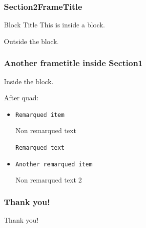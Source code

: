 \documentclass[10pt]{beamer}
\begin{document}


\begin{frame}[fragile]
\frametitle{Section2FrameTitle}

\begin{block}{Block Title}
This is inside a block.


\end{block}

Outside the block.

\end{frame}

\begin{frame}
\frametitle{Another frametitle inside Section1}


\begin{block}{}
Inside the block.
\end{block}


\quad


After quad:

\begin{itemize}

\item {\tt Remarqued item}

Non remarqued text

{\tt Remarqued text} 

 \item {\tt Another remarqued item}

Non remarqued text 2 

\end{itemize}

\end{frame}






\begin{frame}

\frametitle{Thank you!}


\begin{center}
Thank you!
\end{center}




\end{frame}

\end{document}
